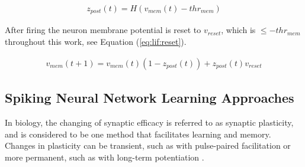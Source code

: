 \documentclass[conference]{IEEEtran}
\newcommand{\asvgf}[4]{
	\begin{figure}[!htbp]
    	\centering
		\adjustbox{max width=#4\linewidth}{}
        \caption{#2.}
        \label{#3}
	\end{figure}
}
\newcommand{\eq}[1]{Equation (\ref{#1})}
\begin{document}
\begin{align}
z_{post}(t) = H(v_{mem}(t) - thr_{mem}) \label{eq:lif:fire}
\end{align}

After firing the neuron membrane potential is reset to $v_{reset}$, which is
$\leq -thr_{mem}$ throughout this work, see \eq{eq:lif:reset}.

\begin{align}
v_{mem}(t+1) = v_{mem}(t)(1 - z_{post}(t)) + z_{post}(t)v_{reset} \label{eq:lif:reset}
\end{align}




\subsection{Spiking Neural Network Learning Approaches}
In biology, the changing of synaptic efficacy is referred to as synaptic
plasticity, and is considered to be one method that facilitates learning and
memory. Changes in plasticity can be transient, such as with pulse-paired
facilitation or more permanent, such as with long-term potentiation
\parencite{ponulak_2011}.


\end{document}
